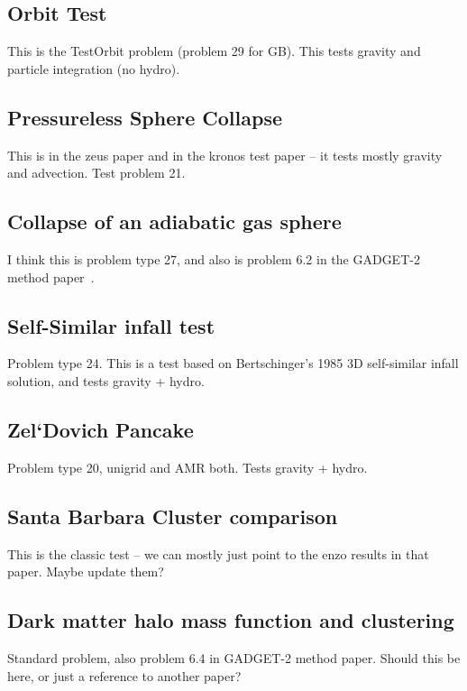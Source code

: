 \subsection{Orbit Test}\label{sec.test.testorbit}
This is the TestOrbit problem (problem 29 for GB).  This tests gravity and particle integration (no hydro).

\subsection{Pressureless Sphere Collapse}\label{sec.test.pressurelesscollapse}
This is in the zeus paper and in the kronos test paper -- it tests mostly gravity and advection.  Test problem 21.

\subsection{Collapse of an adiabatic gas sphere}\label{sec.tests.adiasphere}
I think this is problem type 27, and also is problem 6.2 in the
GADGET-2 method paper~\citep{gadget_2_method}.



\subsection{Self-Similar infall test}\label{sec.tests.infall}
Problem type 24.  This is a test based on Bertschinger's 1985 3D self-similar infall
solution, and tests gravity + hydro.

\subsection{Zel`Dovich Pancake}\label{sec.tests.pancake}
Problem type 20, unigrid and AMR both.  Tests gravity + hydro.

\subsection{Santa Barbara Cluster comparison}\label{sec.tests.santabarbara}
This is the classic test -- we can mostly just point to the enzo results in that paper.  Maybe update them?

\subsection{Dark matter halo mass function and clustering}\label{sec.tests.dm}
Standard problem, also problem 6.4 in GADGET-2 method paper.  Should this be here, or just a reference to another paper?

